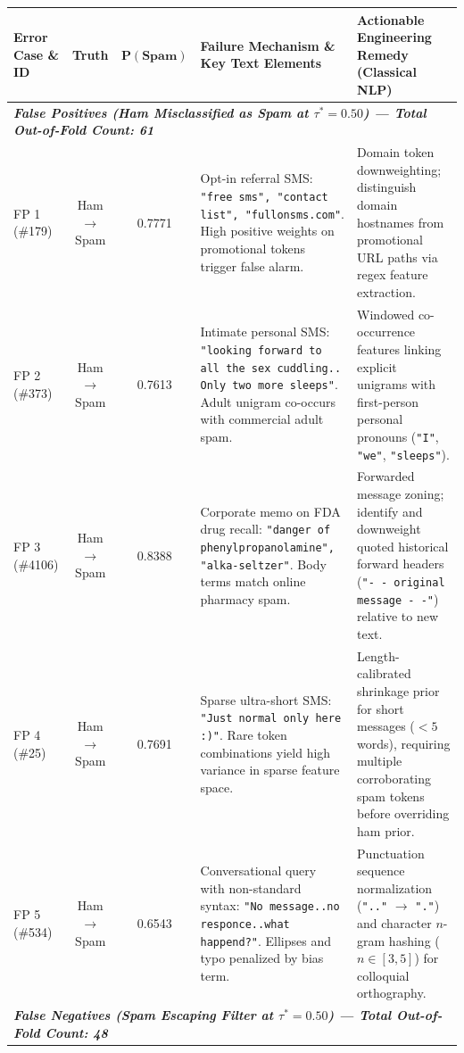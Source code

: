 \documentclass[9.5pt,twocolumn,letterpaper]{article}
\begin{document}
\begin{table}[t]
\centering
\scriptsize
\setlength{\tabcolsep}{3.0pt}
\renewcommand{\arraystretch}{1.12}
\begin{tabularx}{\textwidth}{l c c X X}
\toprule
\textbf{Error Case \& ID} & \textbf{Truth} & $\bm{P(\text{Spam})}$ & \textbf{Failure Mechanism \& Key Text Elements} & \textbf{Actionable Engineering Remedy (Classical NLP)} \\
\midrule
\multicolumn{5}{l}{\textit{\textbf{False Positives (Ham Misclassified as Spam at $\tau^*=0.50$) --- Total Out-of-Fold Count: 61}}} \\
FP 1 (\#179) & Ham $\to$ Spam & 0.7771 & Opt-in referral SMS: \texttt{"free sms", "contact list", "fullonsms.com"}. High positive weights on promotional tokens trigger false alarm. & Domain token downweighting; distinguish domain hostnames from promotional URL paths via regex feature extraction. \\
FP 2 (\#373) & Ham $\to$ Spam & 0.7613 & Intimate personal SMS: \texttt{"looking forward to all the sex cuddling.. Only two more sleeps"}. Adult unigram co-occurs with commercial adult spam. & Windowed co-occurrence features linking explicit unigrams with first-person personal pronouns (\texttt{"I"}, \texttt{"we"}, \texttt{"sleeps"}). \\
FP 3 (\#4106) & Ham $\to$ Spam & 0.8388 & Corporate memo on FDA drug recall: \texttt{"danger of phenylpropanolamine", "alka-seltzer"}. Body terms match online pharmacy spam. & Forwarded message zoning; identify and downweight quoted historical forward headers (\texttt{"- - original message - -"}) relative to new text. \\
FP 4 (\#25) & Ham $\to$ Spam & 0.7691 & Sparse ultra-short SMS: \texttt{"Just normal only here :)"}. Rare token combinations yield high variance in sparse feature space. & Length-calibrated shrinkage prior for short messages ($<5$ words), requiring multiple corroborating spam tokens before overriding ham prior. \\
FP 5 (\#534) & Ham $\to$ Spam & 0.6543 & Conversational query with non-standard syntax: \texttt{"No message..no responce..what happend?"}. Ellipses and typo penalized by bias term. & Punctuation sequence normalization (\texttt{".."} $\to$ \texttt{"."}) and character $n$-gram hashing ($n \in [3, 5]$) for colloquial orthography. \\
\midrule
\multicolumn{5}{l}{\textit{\textbf{False Negatives (Spam Escaping Filter at $\tau^*=0.50$) --- Total Out-of-Fold Count: 48}}} \\

\end{tabularx}
\end{table}
\end{document}
